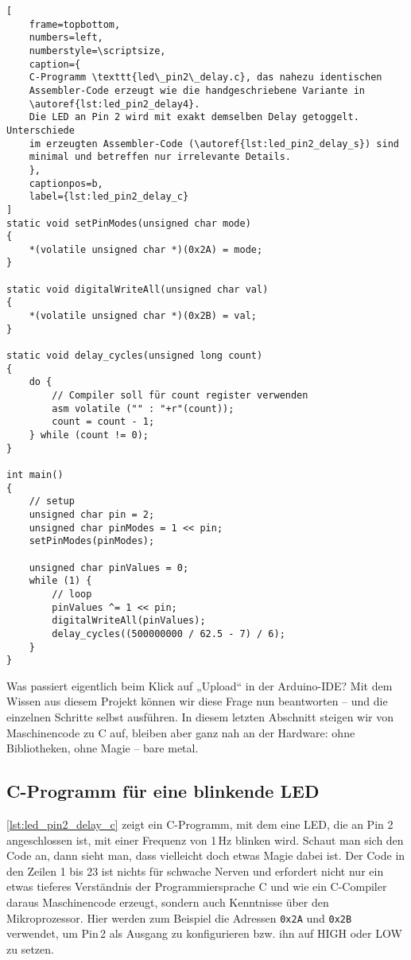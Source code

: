 \documentclass[a4paper,12pt]{article}
\begin{document}
\begin{listing}[htbp]
\begin{lstlisting}[
    frame=topbottom,
    numbers=left,
    numberstyle=\scriptsize,
    caption={
	C-Programm \texttt{led\_pin2\_delay.c}, das nahezu identischen
	Assembler-Code erzeugt wie die handgeschriebene Variante in
	\autoref{lst:led_pin2_delay4}.
	Die LED an Pin 2 wird mit exakt demselben Delay getoggelt. Unterschiede
	im erzeugten Assembler-Code (\autoref{lst:led_pin2_delay_s}) sind
	minimal und betreffen nur irrelevante Details.
    },
    captionpos=b,
    label={lst:led_pin2_delay_c}
]
static void setPinModes(unsigned char mode)
{
    *(volatile unsigned char *)(0x2A) = mode;
}

static void digitalWriteAll(unsigned char val)
{
    *(volatile unsigned char *)(0x2B) = val;
}

static void delay_cycles(unsigned long count)
{
    do {
        // Compiler soll für count register verwenden
        asm volatile ("" : "+r"(count));
        count = count - 1;
    } while (count != 0);
}

int main()
{
    // setup
    unsigned char pin = 2;
    unsigned char pinModes = 1 << pin;
    setPinModes(pinModes);

    unsigned char pinValues = 0;
    while (1) {
        // loop
        pinValues ^= 1 << pin;
        digitalWriteAll(pinValues);
        delay_cycles((500000000 / 62.5 - 7) / 6);
    }
}
\end{lstlisting}
\end{listing}

\noindent
Was passiert eigentlich beim Klick auf „Upload“ in der Arduino-IDE? Mit dem
Wissen aus diesem Projekt können wir diese Frage nun beantworten – und die
einzelnen Schritte selbst ausführen. In diesem letzten Abschnitt steigen wir
von Maschinencode zu C auf, bleiben aber ganz nah an der Hardware: ohne
Bibliotheken, ohne Magie – bare metal.

\subsection{C-Programm für eine blinkende LED}
\autoref{lst:led_pin2_delay_c} zeigt ein C-Programm, mit dem eine LED, die an
Pin 2 angeschlossen ist, mit einer Frequenz von 1 Hz blinken wird. Schaut man
sich den Code an, dann sieht man, dass vielleicht doch etwas Magie dabei ist.
Der Code in den Zeilen 1 bis 23 ist nichts für schwache Nerven und erfordert
nicht nur ein etwas tieferes Verständnis der Programmiersprache C und wie ein
C-Compiler daraus Maschinencode erzeugt, sondern auch Kenntnisse über den
Mikroprozessor. Hier werden zum Beispiel die Adressen \texttt{0x2A} und
\texttt{0x2B} verwendet, um Pin 2 als Ausgang zu konfigurieren bzw. ihn auf
HIGH oder LOW zu setzen.
\end{document}
